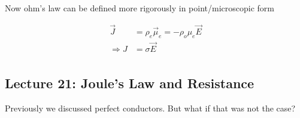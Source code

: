 \documentclass[10pt]{article}
\begin{document}
Now ohm's law can be defined more rigorously in point/microscopic form


\begin{equation}
	\begin{split}
		\vec{J} &= \rho_e \vec{\mu}_e = - \rho_o \mu_e \vec{E} \\
		 \Rightarrow J &= \sigma \vec{E} \\
	\end{split}
	\label{eq:259:point_ohm}
\end{equation}






\subsection{Lecture 21: Joule's Law and Resistance}

\begin{blockquote}
	Previously we discussed perfect conductors. But what if that was not the case?
\end{blockquote}
\end{document}
